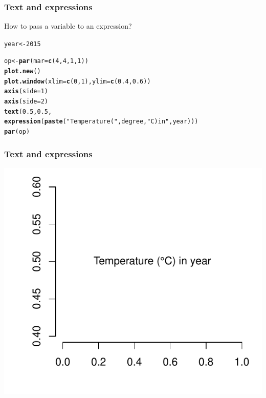 \documentclass[12pt]{beamer}\usepackage[]{graphicx}\usepackage[]{color}
\makeatletter
\newcommand{\hlnum}[1]{\textcolor[rgb]{0.686,0.059,0.569}{#1}}%
\newcommand{\hlstr}[1]{\textcolor[rgb]{0.192,0.494,0.8}{#1}}%
\newcommand{\hlstd}[1]{\textcolor[rgb]{0.345,0.345,0.345}{#1}}%
\newcommand{\hlkwb}[1]{\textcolor[rgb]{0.69,0.353,0.396}{#1}}%
\newcommand{\hlkwc}[1]{\textcolor[rgb]{0.333,0.667,0.333}{#1}}%
\newcommand{\hlkwd}[1]{\textcolor[rgb]{0.737,0.353,0.396}{\textbf{#1}}}%
\newenvironment{kframe}{%
 \def\at@end@of@kframe{}%
 \ifinner\ifhmode%
  \def\at@end@of@kframe{\end{minipage}}%
  \begin{minipage}{\columnwidth}%
 \fi\fi%
 \def\FrameCommand##1{\hskip\@totalleftmargin \hskip-\fboxsep
 \colorbox{shadecolor}{##1}\hskip-\fboxsep
     \hskip-\linewidth \hskip-\@totalleftmargin \hskip\columnwidth}%
 \MakeFramed {\advance\hsize-\width
   \@totalleftmargin\z@ \linewidth\hsize
   \@setminipage}}%
 {\par\unskip\endMakeFramed%
 \at@end@of@kframe}
\newenvironment{knitrout}{}{} %
\makeatother
\begin{document}
\begin{frame}[fragile]
\frametitle{Text and expressions}

How to pass a variable to an expression?
\begin{knitrout}\footnotesize
{}\color{fgcolor}\begin{kframe}
\begin{alltt}
\hlstd{year} \hlkwb{<-} \hlnum{2015}

\hlstd{op} \hlkwb{<-} \hlkwd{par}\hlstd{(}\hlkwc{mar} \hlstd{=} \hlkwd{c}\hlstd{(}\hlnum{4}\hlstd{,} \hlnum{4}\hlstd{,} \hlnum{1}\hlstd{,} \hlnum{1}\hlstd{))}
\hlkwd{plot.new}\hlstd{()}
\hlkwd{plot.window}\hlstd{(}\hlkwc{xlim} \hlstd{=} \hlkwd{c}\hlstd{(}\hlnum{0}\hlstd{,} \hlnum{1}\hlstd{),} \hlkwc{ylim} \hlstd{=} \hlkwd{c}\hlstd{(}\hlnum{0.4}\hlstd{,} \hlnum{0.6}\hlstd{))}
\hlkwd{axis}\hlstd{(}\hlkwc{side} \hlstd{=} \hlnum{1}\hlstd{)}
\hlkwd{axis}\hlstd{(}\hlkwc{side} \hlstd{=} \hlnum{2}\hlstd{)}
\hlkwd{text}\hlstd{(}\hlnum{0.5}\hlstd{,} \hlnum{0.5}\hlstd{,}
     \hlkwd{expression}\hlstd{(}\hlkwd{paste}\hlstd{(}\hlstr{"Temperature ("}\hlstd{, degree,} \hlstr{"C) in "}\hlstd{, year)))}
\hlkwd{par}\hlstd{(op)}
\end{alltt}
\end{kframe}
\end{knitrout}

\end{frame}


\begin{frame}[fragile]
\frametitle{Text and expressions}

\begin{knitrout}\footnotesize
{}\color{fgcolor}

{\centering \includegraphics[width=.8\linewidth,height=.7\linewidth]{figure/formula2-1} 

}



\end{knitrout}

\end{frame}
\end{document}
